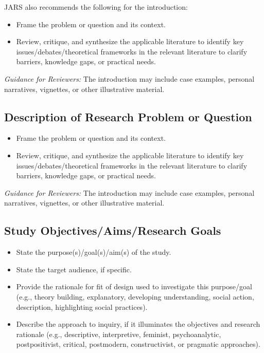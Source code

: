 \documentclass[acmsmall]{acmart}
\begin{document}
JARS also recommends the following for the introduction:
\begin{itemize}
    \item Frame the problem or question and its context.
    \item Review, critique, and synthesize the applicable literature to identify key issues/debates/theoretical frameworks in the relevant literature to clarify barriers, knowledge gaps, or practical needs.
\end{itemize}

\textit{Guidance for Reviewers:} The introduction may include case examples, personal narratives, vignettes, or other
illustrative material.

\subsection{Description of Research Problem or Question}

\begin{itemize}
    \item Frame the problem or question and its context.
    \item Review, critique, and synthesize the applicable literature to identify key issues/debates/theoretical frameworks in the relevant literature to clarify barriers, knowledge gaps, or practical needs.
\end{itemize}

\textit{Guidance for Reviewers:} The introduction may include case examples, personal narratives, vignettes, or other illustrative material.

\subsection{Study Objectives/Aims/Research Goals}

\begin{itemize}
    \item State the purpose(s)/goal(s)/aim(s) of the study.
    \item State the target audience, if specific.
    \item Provide the rationale for fit of design used to investigate this purpose/goal (e.g., theory building, explanatory, developing understanding, social action, description, highlighting social practices).
    \item Describe the approach to inquiry, if it illuminates the objectives and research rationale (e.g., descriptive, interpretive, feminist, psychoanalytic, postpositivist, critical, postmodern, constructivist, or pragmatic approaches).
\end{itemize}
\end{document}
